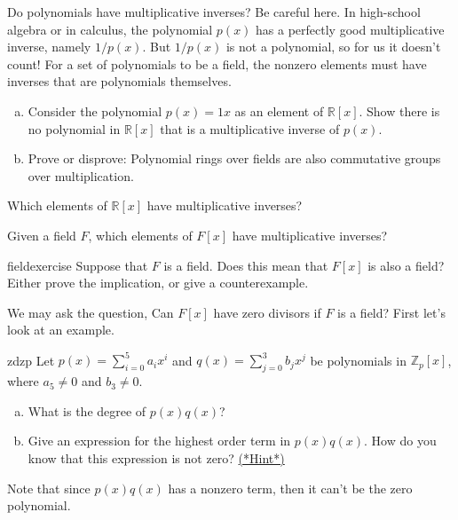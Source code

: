 Do polynomials have multiplicative inverses? Be careful here. In high-school algebra or in calculus,   the polynomial $p(x)$ has a perfectly good multiplicative inverse, namely  $1/p(x)$. But $1/p(x)$ is not a polynomial, so for us it doesn't count! For a set of polynomials to be a field, the nonzero elements must have inverses that are polynomials themselves.

\begin{exercise}{}
\begin{enumerate}[(a)]
\item
Consider the  polynomial $p(x)= 1x$ as an element of $\mathbb{R}[x]$. Show there is no polynomial in $\mathbb{R}[x]$ that is a multiplicative inverse of $p(x)$.
\item
Prove or disprove: Polynomial rings over fields are also commutative groups over multiplication.
\end{enumerate}
\end{exercise}

\begin{exercise}{}
Which elements of $\mathbb{R}[x]$ have multiplicative inverses?
\end{exercise}


\begin{exercise}{}
Given a field $F$, which elements of $F[x]$ have multiplicative inverses?
\end{exercise}

\begin{exercise}{fieldexercise}
Suppose that $F$ is a field. Does this mean that $F[x]$ is also a field? Either prove the implication, or give a counterexample.
\end{exercise}

We may ask the question, Can $F[x]$ have zero divisors if $F$ is a field? First let's look at an example.

\begin{exercise}{zdzp}
Let $p(x)=\sum_{i=0}^{5} a_ix^i$ and $q(x)=\sum_{j=0}^{3} b_jx^j$ be polynomials in $\mathbb{Z}_p[x]$, where $a_5\neq 0$ and $b_3\neq 0$.
\begin{enumerate}[(a)]
\item
What is the degree of $p(x)q(x)$?
\item
Give an expression for the highest order term in $p(x)q(x)$. How do you know that this expression is not zero? \hyperref[sec:Rings:Hints]{(*Hint*)} 
\end{enumerate}
Note that since $p(x)q(x)$ has a nonzero term, then it can't be the zero polynomial.
\end{exercise}

